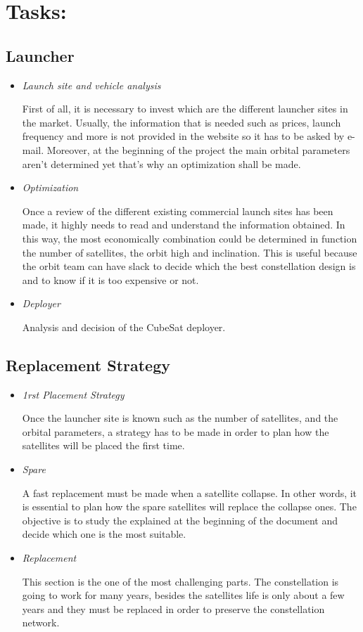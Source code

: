 \documentclass{article}
\begin{document}
\section{Tasks:}

\subsection{Launcher}
\begin{itemize}

\item \emph{Launch site and vehicle analysis}


First of all, it is necessary to invest which are the different launcher sites in the market. Usually, the information that is needed such as prices, launch frequency and more is not provided in the website so it has to be asked by e-mail. 
Moreover, at the beginning of the project the main orbital parameters aren’t determined yet that’s why an optimization shall be made. 

\item \emph{Optimization}

Once a review of the different existing commercial launch sites has been made, it highly needs to read and understand the information obtained. In this way, the most economically combination could be determined in function the number of satellites, the orbit high and inclination. 
This is useful because the orbit team can have slack to decide which the best constellation design is and to know if it is too expensive or not. 


\item \emph{Deployer}

Analysis and decision of the CubeSat deployer.

\end{itemize}

\subsection{Replacement Strategy}
\begin{itemize}

\item \emph{1rst Placement Strategy}

Once the launcher site is known such as the number of satellites, and the orbital parameters, a strategy has to be made in order to plan how the satellites will be placed the first time. 

\item \emph{Spare}

A fast replacement must be made when a satellite collapse. In other words, it is essential to plan how the spare satellites will replace the collapse ones. The objective is to study the explained at the beginning of the document and decide which one is the most suitable. 

\item \emph{Replacement}

This section is the one of the most challenging parts. The constellation is going to work for many years, besides the satellites life is only about a few years and they must be replaced in order to preserve the constellation network.
\end{itemize} 
 
\end{document}
